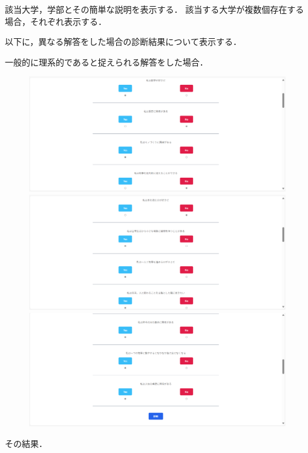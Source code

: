 \documentclass[a4j, titlepage]{jarticle}
\begin{document}
該当大学，学部とその簡単な説明を表示する．
該当する大学が複数個存在する場合，それぞれ表示する．

以下に，異なる解答をした場合の診断結果について表示する．

一般的に理系的であると捉えられる解答をした場合．

\begin{figure}[h]
  \centering
\includegraphics[scale=0.20]{dousakekka-4.png}
\includegraphics[scale=0.20]{dousakekka-5.png}
\includegraphics[scale=0.20]{dousakekka-6.png}
\end{figure}

その結果．
\end{document}
